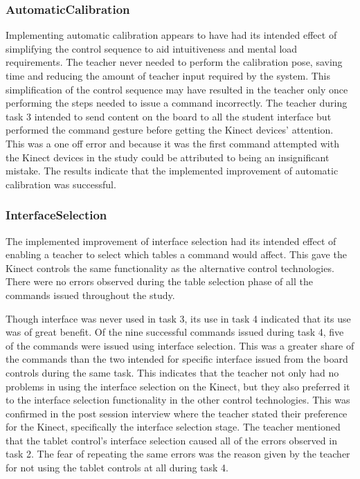 \documentclass[link]{IWCOMP}
\begin{document}
\subsubsection{AutomaticCalibration}
\label{sec:discussionSuccessAutomaticCalibration}

Implementing automatic calibration appears to have had its intended effect of simplifying the control sequence to aid intuitiveness and mental load requirements.
The teacher never needed to perform the calibration pose, saving time and reducing the amount of teacher input required by the system.
This simplification of the control sequence may have resulted in the teacher only once performing the steps needed to issue a command incorrectly.
The teacher during task 3 intended to send content on the board to all the student interface but performed the command gesture before getting the Kinect devices' attention.
This was a one off error and because it was the first command attempted with the Kinect devices in the study could be attributed to being an insignificant mistake.
The results indicate that the implemented improvement of automatic calibration was successful.

\subsubsection{InterfaceSelection}
\label{sec:discussionSuccessInterfaceSelection}

The implemented improvement of interface selection had its intended effect of enabling a teacher to select which tables a command would affect.
This gave the Kinect controls the same functionality as the alternative control technologies.
There were no errors observed during the table selection phase of all the commands issued throughout the study.

Though interface was never used in task 3, its use in task 4 indicated that its use was of great benefit.
Of the nine successful commands issued during task 4, five of the commands were issued using interface selection.
This was a greater share of the commands than the two intended for specific interface issued from the board controls during the same task.
This indicates that the teacher not only had no problems in using the interface selection on the Kinect, but they also preferred it to the interface selection functionality in the other control technologies.
This was confirmed in the post session interview where the teacher stated their preference for the Kinect, specifically the interface selection stage.
The teacher mentioned that the tablet control's interface selection caused all of the errors observed in task 2.
The fear of repeating the same errors was the reason given by the teacher for not using the tablet controls at all during task 4.
\end{document}
